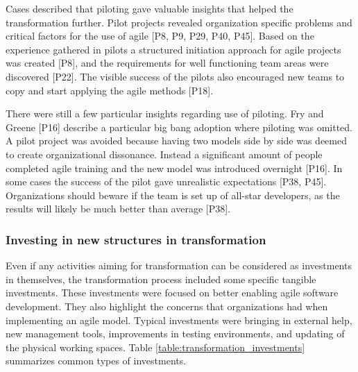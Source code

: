 \documentclass[preprint,authoryear,12pt]{elsarticle}
\begin{document}
Cases described that piloting gave valuable insights that helped the
transformation further.
Pilot projects revealed organization specific problems and critical factors for
the use of agile [P8, P9, P29, P40, P45].
Based on the experience gathered in pilots a structured initiation approach for
agile projects was created [P8], and the requirements for well functioning team
areas were discovered [P22].
The visible success of the pilots also encouraged new teams to copy and start
applying the agile methods [P18].


There were still a few particular insights regarding use of piloting.
Fry and Greene [P16] describe a particular big bang adoption where piloting was
omitted. A pilot project was avoided because having two models side by side was
deemed to create organizational dissonance. Instead a significant amount of
people completed agile training and the new model was introduced overnight
[P16].
In some cases the success of the pilot gave unrealistic expectations [P38, P45].
Organizations should beware if the team is set up of all-star developers, as
the results will likely be much better than average [P38].



\subsubsection{Investing in new structures in transformation}

Even if any activities aiming for transformation can be considered as
investments in themselves, the transformation process included some specific
tangible investments. These investments were focused on better enabling agile
software development. They also highlight the concerns that organizations had when
implementing an agile model. Typical investments were bringing in external help,
new management tools, improvements in testing environments, and updating of the
physical working spaces. Table \ref{table:transformation_investments} summarizes
common types of investments.
\end{document}
